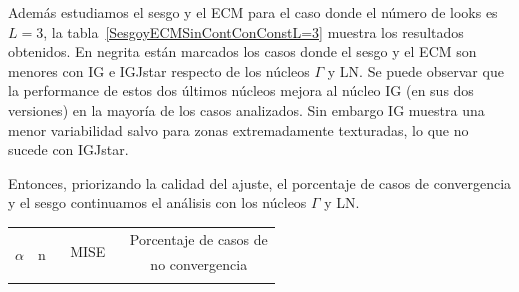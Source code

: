 Además estudiamos el sesgo y el ECM para el caso donde el número de looks es $L=3$, la tabla~\ref{SesgoyECMSinContConConstL=3} muestra los resultados obtenidos. En negrita están marcados los casos donde el sesgo y el ECM son menores con IG e IGJstar respecto de los núcleos $\Gamma$ y LN. Se puede observar que la performance de estos dos últimos núcleos  mejora al núcleo IG (en sus dos versiones) en la mayoría de los casos analizados. Sin embargo IG muestra una menor variabilidad salvo para zonas extremadamente texturadas, lo que no sucede con IGJstar. 

Entonces, priorizando la calidad del ajuste, el porcentaje de casos de convergencia y el sesgo continuamos el análisis con los núcleos $\Gamma$ y LN.

\begin{table}[hbt]										
	\centering									
	\small									
	\begin{tabular}{cc|ccccc|cccc}									
		\toprule									
		\multirow{3 }{*}{$\alpha$} &\multirow{3 }{*}{ n  } & \multicolumn{5}{c|}{\multirow{2 }{*}{MISE}} & \multicolumn{4}{c}{Porcentaje de casos de}\\
		&  &            &            &    &    &         &   \multicolumn{4}{c}{no convergencia}\\
		
		\cmidrule(r){3-7}
		\cmidrule(r){8-11}
		

\end{tabular}
\end{table}
